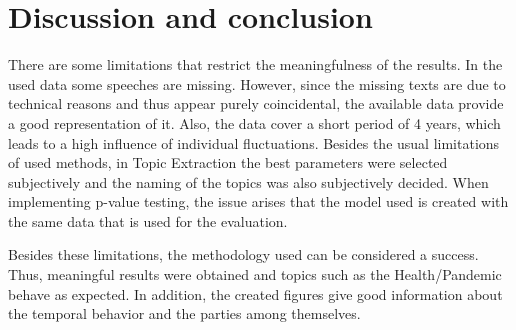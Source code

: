 \documentclass{article}
\begin{document}
\section{Discussion and conclusion}

There are some limitations that restrict the meaningfulness of the results. 
In the used data some speeches are missing.
However, since the missing texts are due to technical reasons and thus appear purely coincidental, the available data provide a good representation of it.
Also, the data cover a short period of 4 years, which leads to a high influence of individual fluctuations.
Besides the usual limitations of used methods, in Topic Extraction the best parameters were selected subjectively and the naming of the topics was also subjectively decided.
When implementing p-value testing, the issue arises that the model used is created with the same data that is used for the evaluation.

Besides these limitations, the methodology used can be considered a success. Thus, meaningful results were obtained and topics such as the Health/Pandemic behave as expected. 
In addition, the created figures give good information about the temporal behavior and the parties among themselves.

\end{document}
